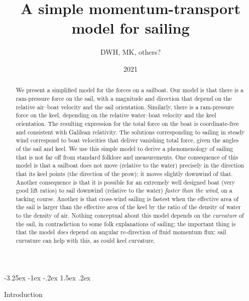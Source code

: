 \documentclass[letterpaper]{article}
\title{\bfseries%
A simple momentum-transport model for sailing}
\author{DWH, MK, others?}
\date{2021}
\makeatletter
\renewcommand\section{\@startsection {section}{1}{\z@}%
  {-3.25ex \@plus -1ex \@minus -.2ex}%
  {1.5ex \@plus .2ex}%
  {\raggedright\normalfont\large\bfseries}}
\makeatother
\begin{document}
\maketitle

\begin{abstract}\noindent
    We present a simplified model for the forces on a sailboat.
    Our model is that there is a ram-pressure force on the sail, with a magnitude and direction that depend on the relative air--boat velocity and the sail orientation.
    Similarly, there is a ram-pressure force on the keel, depending on the relative water--boat velocity and the keel orientation.
    The resulting expression for the total force on the boat is coordinate-free and consistent with Galilean relativity.
    The solutions corresponding to sailing in steady wind correspond to boat velocities that deliver vanishing total force, given the angles of the sail and keel.
    We use this simple model to derive a phenomenology of sailing that is not far off from standard folklore and measurements.
    One consequence of this model is that a sailboat does not move (relative to the water) precisely in the direction that its keel points (the direction of the prow); it moves slightly downwind of that.
    Another consequence is that it is possible for an extremely well designed boat (very good lift ratios) to sail downwind (relative to the water) \emph{faster than the wind}, on a tacking course.
    Another is that cross-wind sailing is fastest when the effective area of the sail is larger than the effective area of the keel by the ratio of the density of water to the density of air.
    Nothing conceptual about this model depends on the \emph{curvature} of the sail, in contradiction to some folk explanations of sailing; the important thing is that the model \emph{does} depend on angular re-direction of fluid momentum flux; sail curvature can help with this, as could keel curvature.
\end{abstract}

\section{Introduction}\label{sec:intro}
\end{document}
